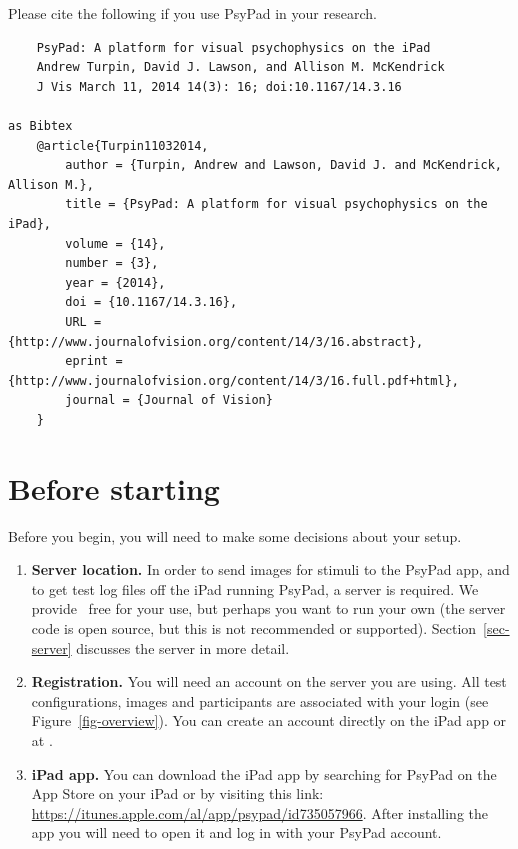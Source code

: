 \documentclass{article}
\begin{document}
Please cite the following if you use PsyPad in your research.
\begin{verbatim}
    PsyPad: A platform for visual psychophysics on the iPad
    Andrew Turpin, David J. Lawson, and Allison M. McKendrick
    J Vis March 11, 2014 14(3): 16; doi:10.1167/14.3.16

as Bibtex
    @article{Turpin11032014,
        author = {Turpin, Andrew and Lawson, David J. and McKendrick, Allison M.}, 
        title = {PsyPad: A platform for visual psychophysics on the iPad},
        volume = {14}, 
        number = {3}, 
        year = {2014}, 
        doi = {10.1167/14.3.16}, 
        URL = {http://www.journalofvision.org/content/14/3/16.abstract}, 
        eprint = {http://www.journalofvision.org/content/14/3/16.full.pdf+html}, 
        journal = {Journal of Vision} 
    }
\end{verbatim}


\newpage
\tableofcontents

\newpage

\section{Before starting}

Before you begin, you will need to make some decisions about your setup.

\begin{enumerate}

\item {\bf Server location.} In order 
to send images for stimuli to the PsyPad app, 
and to get test log files off the 
iPad running PsyPad, a server is required.  
We provide \ 
free for your use, but perhaps you want to run your own (the server code is open source, but this is not recommended or supported). 
Section~\ref{sec-server} discusses the server in more detail.

\item {\bf Registration.}
You will need an account on the server you are using.
All test configurations, images and participants are associated with
your login (see Figure~\ref{fig-overview}).
You can create an account directly on the iPad app or at
.

\item {\bf iPad app.}
You can download the iPad app by searching for PsyPad on the App Store on your iPad or by visiting this link: \url{https://itunes.apple.com/al/app/psypad/id735057966}. After installing the app you will need to open it and log in with your PsyPad account.

\end{enumerate}
\end{document}
